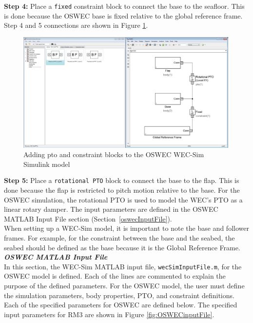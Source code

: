 \textbf{Step 4:} Place a \texttt{fixed} constraint block to connect the base to the seafloor. This is done because the OSWEC base is fixed relative to the global reference frame. Step 4 and 5 connections are shown in Figure \ref{OSWEC_WECSim}. 

        \begin{figure}[H]
        \centering
        \includegraphics[width=0.99\textwidth]{application/images/OSWEC_WECSim}
        \caption{Adding pto and constraint blocks to the OSWEC WEC-Sim Simulink model}
        \label{OSWEC_WECSim}
        \end{figure}

\textbf{Step 5:} Place a \texttt{rotational PTO} block to connect the base to the flap. This is done because the flap is restricted to pitch motion relative to the base.  For the OSWEC simulation, the rotational PTO is used to model the WEC's PTO as a linear rotary damper. The input parameters are defined in the OSWEC MATLAB Input File section (Section~\ref{oswecInputFile}). \\

When setting up a WEC-Sim model, it is important to note the base and follower frames. For example, for the constraint between the base and the seabed, the seabed should be defined as the base because it is the Global Reference Frame.\\

\textbf{\textit{OSWEC MATLAB Input File}} \label{oswecInputFile}\\
In this section, the WEC-Sim MATLAB input file, \texttt{wecSimInputFile.m}, for the OSWEC model is defined. Each of the lines are commented to explain the purpose of the defined parameters. For the OSWEC model, the user must define the simulation parameters, body properties, PTO, and constraint definitions. Each of the specified parameters for OSWEC are defined below. The specified input parameters for RM3 are shown in Figure \ref{fig:OSWECinputFile}. 

